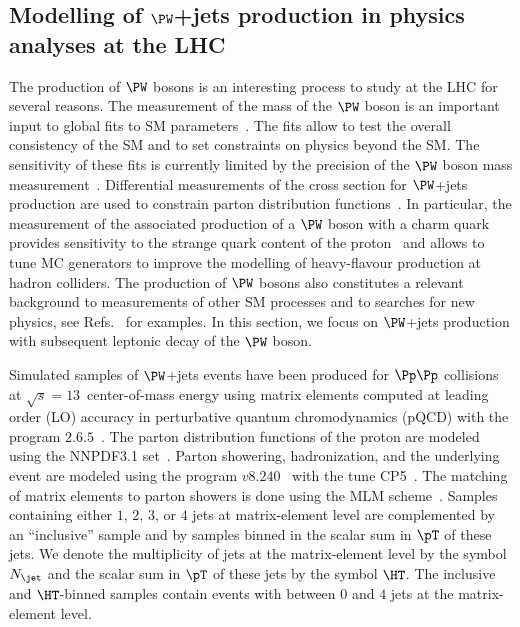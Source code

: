 \subsection{Modelling of \texorpdfstring{$\PW$}{W}+jets production in physics analyses at the LHC}
\label{sec:examples_background_yield}

The production of $\PW$ bosons is an interesting process to study at the LHC for several reasons.
The measurement of the mass of the $\PW$ boson is an important input to global fits to SM parameters~\cite{Baak:2014ora}.
The fits allow to test the overall consistency of the SM and to set constraints on physics beyond the SM.
The sensitivity of these fits is currently limited by the precision of the $\PW$ boson mass measurement~\cite{Baak:2014ora}.
Differential measurements of the cross section for $\PW$+jets production 
are used to constrain parton distribution functions~\cite{CMS:2016qqr,ATLAS:2016nqi,ATLAS:2019fgb,CMS:2020cph}.
In particular, the measurement of the associated production of a $\PW$ boson with a charm quark
provides sensitivity to the strange quark content of the proton~\cite{CMS:2013wql,ATLAS:2014jkm,CMS:2018dxg} 
and allows to tune MC generators to improve the modelling of heavy-flavour production at hadron colliders.
The production of $\PW$ bosons also constitutes a relevant background to measurements of other SM processes
and to searches for new physics, see Refs.~\cite{ATLAS:2014aga,Aad:2019yxi,CMS-HIG-13-027,CMS-HIG-17-006} for examples.
In this section, we focus on $\PW$+jets production with subsequent leptonic decay of the $\PW$ boson.

Simulated samples of $\PW$+jets events have been produced for $\Pp\Pp$ collisions at $\sqrt{s}=13$~\TeV center-of-mass energy
using matrix elements computed at leading order (LO) accuracy in perturbative quantum chromodynamics (pQCD)
with the program \MGvATNLO $2.6.5$~\cite{MGvATNLO}.
The parton distribution functions of the proton are modeled using the NNPDF3.1 set~\cite{NNPDF:2017mvq}.
Parton showering, hadronization, and the underlying event are modeled using the program \PYTHIA $v8.240$~\cite{PYTHIA} with the tune \textrm{CP5}~\cite{Sirunyan:2019dfx}.
The matching of matrix elements to parton showers is done using the \textrm{MLM} scheme~\cite{Alwall:2007fs}.
Samples containing either $1$, $2$, $3$, or $4$ jets at matrix-element level are complemented by an ``inclusive'' sample 
and by samples binned in the scalar sum in $\pT$ of these jets.
We denote the multiplicity of jets at the matrix-element level by the symbol $N_{\jet}$ and the scalar sum in $\pT$ of these jets by the symbol $\HT$.
The inclusive and $\HT$-binned samples contain events with between $0$ and $4$ jets at the matrix-element level.

